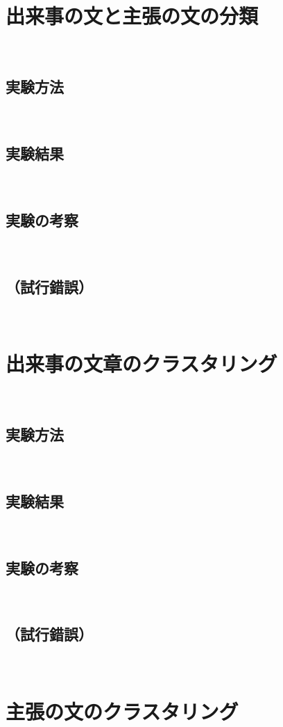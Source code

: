 \documentclass[12pt,a4j]{jreport}
\begin{document}
\section{出来事の文と主張の文の分類}
~

\subsection{実験方法}
~

\subsection{実験結果}
~

\subsection{実験の考察}
~

\subsection{（試行錯誤）}
~

\section{出来事の文章のクラスタリング}
~

\subsection{実験方法}
~

\subsection{実験結果}
~

\subsection{実験の考察}
~

\subsection{（試行錯誤）}
~

\section{主張の文のクラスタリング}
~
\end{document}
